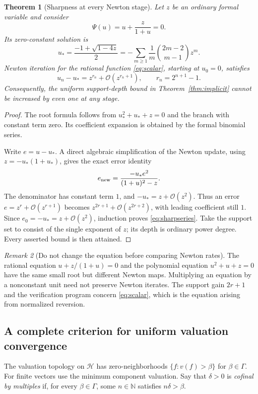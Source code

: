 \documentclass[11pt,a4paper]{article}
\newtheorem{theorem}{Theorem}[section]
\theoremstyle{definition}
\theoremstyle{remark}
\newtheorem{remark}[theorem]{Remark}
\newcommand{\N}{\mathbb N}
\newcommand{\HH}{\mathscr H}
\newcommand{\Ocal}{\mathcal O}
\begin{document}
\begin{theorem}[Sharpness at every Newton stage]\label{thm:sharp}
Let $z$ be an ordinary formal variable and consider
\begin{equation}\label{eq:scalar}
 \Psi(u)=u+\frac{z}{1+u}=0.
\end{equation}
Its zero-constant solution is
\begin{equation}\label{eq:Catalan}
 u_* =\frac{-1+\sqrt{1-4z}}2
      =-\sum_{m\ge1}\frac1m\binom{2m-2}{m-1}z^m.
\end{equation}
Newton iteration for the rational function \eqref{eq:scalar}, starting at
$u_0=0$, satisfies
\begin{equation}\label{eq:sharpseries}
 u_n-u_*=z^{r_n}+\Ocal(z^{r_n+1}),\qquad r_n=2^{n+1}-1.
\end{equation}
Consequently, the uniform support-depth bound in
Theorem~\ref{thm:implicit} cannot be increased by even one at any stage.
\end{theorem}
\begin{proof}
The root formula follows from $u_*^2+u_*+z=0$ and the branch with constant
term zero. Its coefficient expansion is obtained by the formal binomial
series.

Write $e=u-u_*$. A direct algebraic simplification of the Newton update,
using $z=-u_*(1+u_*)$, gives the exact error identity
\begin{equation}\label{eq:exactNewtonError}
 e_{\rm new}
 =\frac{-u_*e^2}{(1+u)^2-z}.
\end{equation}
The denominator has constant term $1$, and $-u_*=z+\Ocal(z^2)$.
Thus an error $e=z^r+\Ocal(z^{r+1})$ becomes
$z^{2r+1}+\Ocal(z^{2r+2})$, with leading coefficient still $1$.
Since $e_0=-u_*=z+\Ocal(z^2)$, induction proves
\eqref{eq:sharpseries}. Take the support set to consist of the single
exponent of $z$; its depth is ordinary power degree. Every asserted bound
is then attained.
\end{proof}

\begin{remark}[Do not change the equation before comparing Newton rates]
The rational equation $u+z/(1+u)=0$ and the polynomial equation
$u^2+u+z=0$ have the same small root but different Newton maps.
Multiplying an equation by a nonconstant unit need not preserve Newton
iterates. The support gain $2r+1$ and the verification program concern
\eqref{eq:scalar}, which is the equation arising from normalized reversion.
\end{remark}

\subsection{A complete criterion for uniform valuation convergence}
The valuation topology on $\HH$ has zero-neighborhoods
$\{f:v(f)>\beta\}$ for $\beta\in\Gamma$. For finite vectors use the
minimum component valuation. Say that $\delta>0$ is \emph{cofinal by
multiples} if, for every $\beta\in\Gamma$, some $n\in\N$ satisfies
$n\delta>\beta$.
\end{document}
